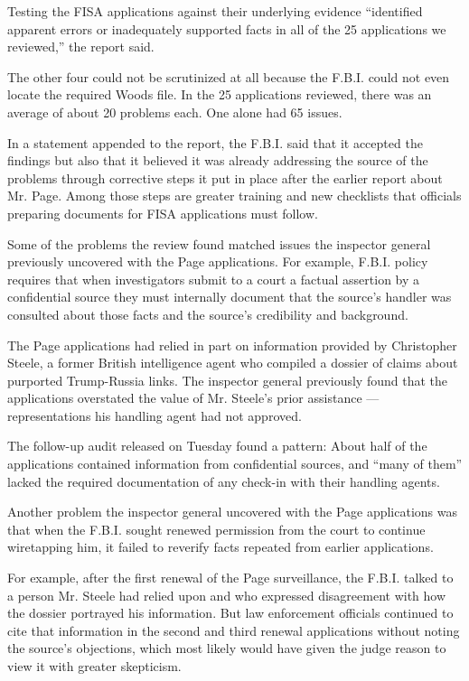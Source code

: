 Testing the FISA applications against their underlying evidence
``identified apparent errors or inadequately supported facts in all of
the 25 applications we reviewed,'' the report said.

The other four could not be scrutinized at all because the F.B.I. could
not even locate the required Woods file. In the 25 applications
reviewed, there was an average of about 20 problems each. One alone had
65 issues.

In a statement appended to the report, the F.B.I. said that it accepted
the findings but also that it believed it was already addressing the
source of the problems through corrective steps it put in place after
the earlier report about Mr. Page. Among those steps are greater
training and new checklists that officials preparing documents for FISA
applications must follow.

Some of the problems the review found matched issues the inspector
general previously uncovered with the Page applications. For example,
F.B.I. policy requires that when investigators submit to a court a
factual assertion by a confidential source they must internally document
that the source's handler was consulted about those facts and the
source's credibility and background.

The Page applications had relied in part on information provided by
Christopher Steele, a former British intelligence agent who compiled a
dossier of claims about purported Trump-Russia links. The inspector
general previously found that the applications overstated the value of
Mr. Steele's prior assistance --- representations his handling agent had
not approved.

The follow-up audit released on Tuesday found a pattern: About half of
the applications contained information from confidential sources, and
``many of them'' lacked the required documentation of any check-in with
their handling agents.

Another problem the inspector general uncovered with the Page
applications was that when the F.B.I. sought renewed permission from the
court to continue wiretapping him, it failed to reverify facts repeated
from earlier applications.

For example, after the first renewal of the Page surveillance, the
F.B.I. talked to a person Mr. Steele had relied upon and who expressed
disagreement with how the dossier portrayed his information. But law
enforcement officials continued to cite that information in the second
and third renewal applications without noting the source's objections,
which most likely would have given the judge reason to view it with
greater skepticism.

